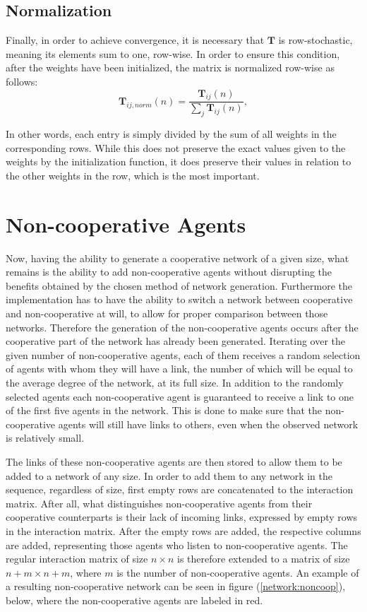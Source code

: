 \documentclass{article}
\newcommand{\T}{\textbf{T}}
\begin{document}
\subsection{Normalization}

Finally, in order to achieve convergence, it is necessary that $\T$ is row-stochastic, meaning its elements sum to one, row-wise. In order to ensure this condition, after the weights have been initialized, the matrix is normalized row-wise as follows:
\begin{equation*}
    \T_{ij, norm}(n) = \frac{\T_{ij}(n)}{\sum_{j}\T_{ij}(n)},
\end{equation*}

In other words, each entry is simply divided by the sum of all weights in the corresponding rows. While this does not preserve the exact values given to the weights by the initialization function, it does preserve their values in relation to the other weights in the row, which is the most important.

\newpage

\section{Non-cooperative Agents}

Now, having the ability to generate a cooperative network of a given size, what remains is the ability to add non-cooperative agents without disrupting the benefits obtained by the chosen method of network generation.
Furthermore the implementation has to have the ability to switch a network between cooperative and non-cooperative at will, to allow for proper comparison between those networks.
Therefore the generation of the non-cooperative agents occurs after the cooperative part of the network has already been generated. Iterating over the given number of non-cooperative agents, each of them receives a random selection of agents with whom they will have a link, the number of which will be equal to the average degree of the network, at its full size.
In addition to the randomly selected agents each non-cooperative agent is guaranteed to receive a link to one of the first five agents in the network. This is done to make sure that the non-cooperative agents will still have links to others, even when the observed network is relatively small.

The links of these non-cooperative agents are then stored to allow them to be added to a network of any size. In order to add them to any network in the sequence, regardless of size, first empty rows are concatenated to the interaction matrix. After all, what distinguishes non-cooperative agents from their cooperative counterparts is their lack of incoming links, expressed by empty rows in the interaction matrix. After the empty rows are added, the respective columns are added, representing those agents who listen to non-cooperative agents. The regular interaction matrix of size $n \times n$ is therefore extended to a matrix of size $n+m \times n+m$, where $m$ is the number of non-cooperative agents.
An example of a resulting non-cooperative network can be seen in figure (\ref{network:noncoop}), below, where the non-cooperative agents are labeled in red.
\end{document}
